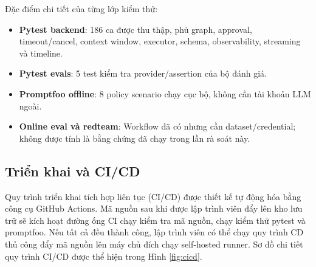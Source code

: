 \documentclass[12pt,a4paper]{article}
\begin{document}
Đặc điểm chi tiết của từng lớp kiểm thử:
\begin{itemize}
    \item \textbf{Pytest backend}: 186 ca được thu thập, phủ graph, approval, timeout/cancel, context window, executor, schema, observability, streaming và timeline.
    \item \textbf{Pytest evals}: 5 test kiểm tra provider/assertion của bộ đánh giá.
    \item \textbf{Promptfoo offline}: 8 policy scenario chạy cục bộ, không cần tài khoản LLM ngoài.
    \item \textbf{Online eval và redteam}: Workflow đã có nhưng cần dataset/credential; không được tính là bằng chứng đã chạy trong lần rà soát này.
\end{itemize}

\subsection{Triển khai và CI/CD}
Quy trình triển khai tích hợp liên tục (CI/CD) được thiết kế tự động hóa bằng công cụ GitHub Actions. Mã nguồn sau khi được lập trình viên đẩy lên kho lưu trữ sẽ kích hoạt đường ống CI chạy kiểm tra mã nguồn, chạy kiểm thử pytest và promptfoo. Nếu tất cả đều thành công, lập trình viên có thể chạy quy trình CD thủ công đẩy mã nguồn lên máy chủ đích chạy self-hosted runner. Sơ đồ chi tiết quy trình CI/CD được thể hiện trong Hình \ref{fig:cicd}.
\end{document}
